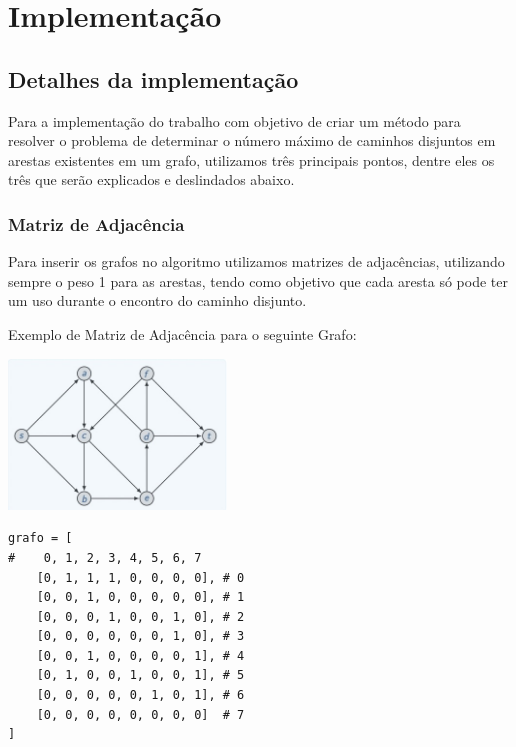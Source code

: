 \section{Implementação}

\subsection{Detalhes da implementação}

Para a implementação do trabalho com objetivo de criar um método para resolver o problema de determinar o número máximo de caminhos disjuntos em arestas existentes em um grafo, utilizamos três principais pontos, dentre eles os três que serão explicados e deslindados abaixo.


\subsubsection{Matriz de Adjacência}
Para inserir os grafos no algoritmo utilizamos matrizes de adjacências, utilizando sempre o peso 1 para as arestas, tendo como objetivo que cada aresta só pode ter um uso durante o encontro do caminho disjunto.

Exemplo de Matriz de Adjacência para o seguinte Grafo:

\begin{center}
\includegraphics[height=4cm]{figuras/04.jpg}
\end{center}

\begin{scriptsize}
\estiloR
\begin{lstlisting}[title={Matriz de Adjacência para o Grafo acima}, label=lst:javacode]
grafo = [
#    0, 1, 2, 3, 4, 5, 6, 7
    [0, 1, 1, 1, 0, 0, 0, 0], # 0
    [0, 0, 1, 0, 0, 0, 0, 0], # 1
    [0, 0, 0, 1, 0, 0, 1, 0], # 2
    [0, 0, 0, 0, 0, 0, 1, 0], # 3
    [0, 0, 1, 0, 0, 0, 0, 1], # 4
    [0, 1, 0, 0, 1, 0, 0, 1], # 5
    [0, 0, 0, 0, 0, 1, 0, 1], # 6
    [0, 0, 0, 0, 0, 0, 0, 0]  # 7
]
\end{lstlisting}
\end{scriptsize}


